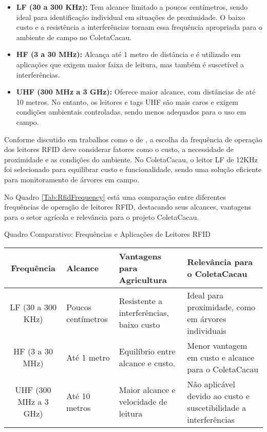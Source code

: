 \begin{itemize}
    \item \textbf{LF (30 a 300 KHz):} Tem alcance limitado a poucos centímetros, sendo ideal para identificação individual em situações de proximidade. O baixo custo e a resistência a interferências tornam essa frequência apropriada para o ambiente de campo no ColetaCacau.
    
    \item \textbf{HF (3 a 30 MHz):} Alcança até 1 metro de distância e é utilizado em aplicações que exigem maior faixa de leitura, mas também é suscetível a interferências.
    
    \item \textbf{UHF (300 MHz a 3 GHz):} Oferece maior alcance, com distâncias de até 10 metros. No entanto, os leitores e tags UHF são mais caros e exigem condições ambientais controladas, sendo menos adequados para o uso em campo.
\end{itemize}

Conforme discutido em trabalhos como o de \cite{Placidi2023LowCostAL}, a escolha da frequência de operação dos leitores RFID deve considerar fatores como o custo, a necessidade de proximidade e as condições do ambiente. No ColetaCacau, o leitor LF de 12KHz foi selecionado para equilibrar custo e funcionalidade, sendo uma solução eficiente para monitoramento de árvores em campo.

No Quadro \ref{Tab:RfidFrequency} está uma comparação entre diferentes frequências de operação de leitores RFID, destacando seus alcances, vantagens para o setor agrícola e relevância para o projeto ColetaCacau.

\begin{quadro}[!htb]
    \centering
    \footnotesize
    \caption{Quadro Comparativo: Frequências e Aplicações de Leitores RFID}
	\begin{tabular}{|c|p{3cm}|p{3cm}|p{5cm}|}
	   \hline
	   \textbf{Frequência} & \centering\textbf{Alcance} & \textbf{Vantagens para Agricultura} & \textbf{Relevância para o ColetaCacau}\\
	   \hline
            LF (30 a 300 KHz)  & Poucos centímetros & Resistente a interferências, baixo custo & Ideal para proximidade, como em árvores individuais \\ 
        \hline
            HF (3 a 30 MHz)        & Até 1 metro     & Equilíbrio entre alcance e custo. & Menor vantagem em custo e alcance para o ColetaCacau \\ 
        \hline
            UHF (300 MHz a 3 GHz)          & Até 10 metros               & Maior alcance e velocidade de leitura          & Não aplicável devido ao custo e suscetibilidade a interferências \\ 
        \hline
	\end{tabular}
    \label{Tab:RfidFrequency}
\end{quadro}

